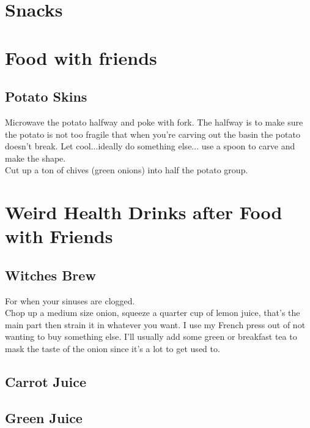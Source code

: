 \documentclass{article}
\begin{document}
\section*{Snacks}


\section*{Food with friends}

\subsection*{Potato Skins} 
Microwave the potato halfway and poke with fork. The halfway is to make sure the potato is not too fragile that when you're carving out the basin the potato doesn't break. Let cool...ideally do something else... use a spoon to carve and make the shape. \\ 

Cut up a ton of chives (green onions) into half the potato group. \\ 

\section*{Weird Health Drinks after Food with Friends}

\subsection*{Witches Brew} 
For when your sinuses are clogged. \\ 
Chop up a medium size onion, squeeze a quarter cup of lemon juice, that's the main part then strain it in whatever you want. I use my French press out of not wanting to buy something else. I'll usually add some green or breakfast tea to mask the taste of the onion since it's a lot to get used to. 

\subsection*{Carrot Juice} 

\subsection*{Green Juice}
\end{document}
